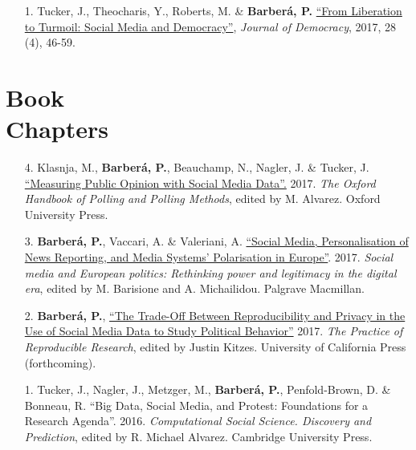\documentclass[margin,line,11pt]{resume}
\begin{document}
\begin{resume}
\begin{itemize}[leftmargin=5.5mm]
\item[1.]  Tucker, J., Theocharis, Y., Roberts, M. \& \textbf{Barber\'{a}, P.} \href{https://muse.jhu.edu/article/671987/pdf}{``From Liberation to Turmoil: Social Media and Democracy''}, \textit{Journal of Democracy}, 2017, 28 (4), 46-59.   
\end{itemize}        %

    \section{\mysidestyle Book\\Chapters} 
\vspace{.15cm}    
\begin{itemize}[leftmargin=5.5mm]
\item[4.] Klasnja, M., \textbf{Barber\'{a}, P.}, Beauchamp, N., Nagler, J. \& Tucker, J. \href{http://www.oxfordhandbooks.com/view/10.1093/oxfordhb/9780190213299.001.0001/oxfordhb-9780190213299-e-3}{``Measuring Public Opinion with Social Media Data''.} 2017. \textit{The Oxford Handbook of Polling and Polling Methods}, edited by M. Alvarez. Oxford University Press.

\item[3.] \textbf{Barber\'{a}, P.}, Vaccari, A. \& Valeriani, A. \href{https://link.springer.com/chapter/10.1057/978-1-137-59890-5_2}{``Social Media, Personalisation of News Reporting, and Media Systems' Polarisation in Europe''}. 2017. \textit{Social media and European politics: Rethinking power and legitimacy in the digital era}, edited by M. Barisione and A. Michailidou. Palgrave Macmillan.

\newpage
    

    
\item[2.] \textbf{Barber\'{a}, P.}, \href{https://www.practicereproducibleresearch.org/case-studies/barbera.html}{``The Trade-Off Between Reproducibility and Privacy in the Use of Social Media Data to Study Political Behavior''} 2017. \textit{The Practice of Reproducible Research}, edited by Justin Kitzes. University of California Press (forthcoming).

\item[1.] Tucker, J., Nagler, J., Metzger, M., \textbf{Barber\'{a}, P.}, Penfold-Brown, D. \& Bonneau, R. ``Big Data, Social Media, and Protest: Foundations for a Research Agenda''. 2016. \textit{Computational Social Science. Discovery and Prediction}, edited by R. Michael Alvarez. Cambridge University Press.
\end{itemize}


\end{resume}
\end{document}
